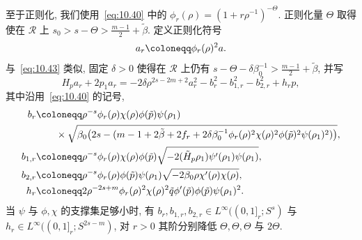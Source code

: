 至于正则化, 我们使用~\eqref{eq:10.40} 中的 $\phi_r(\rho) = (1 + r\rho^{-1})^{-\Theta}$. 正则化量 $\Theta$ 取得使在 $\mathcal{R}$ 上 $s_0 > s - \Theta > \frac{m-1}{2} + \tilde{\beta}$. 定义正则化符号
\begin{equation}\label{eq:10.67}
    a_r \defeq \phi_r(\rho)^2 a.
\end{equation}
与~\eqref{eq:10.43} 类似, 固定 $\delta > 0$ 使得在 $\mathcal{R}$ 上仍有 $s - \Theta - \delta\beta_0^{-1} > \frac{m-1}{2} + \tilde{\beta}$, 并写
\begin{equation}\label{eq:10.68}
    H_p a_r + 2p_1 a_r = -2\delta\rho^{2s-2m+2}a_r^2 - b_r^2 - b_{1,r}^2 - b_{2,r}^2 + h_r p,
\end{equation}
其中沿用~\eqref{eq:10.40} 的记号,
\begin{equation}\label{eq:10.69}
    \begin{aligned}
        b_r &\defeq \rho^{-s}\phi_r(\rho)\chi(\rho)\phi(\tilde{p})\psi(\rho_1) \\
        &\qquad \times \sqrt{\beta_0\bigl(2s - (m - 1 + 2\tilde{\beta} + 2f_r + 2\delta\beta_0^{-1}\phi_r(\rho)^2\chi(\rho)^2\phi(\tilde{p})^2\psi(\rho_1)^2)\bigr)}, \\
        b_{1,r} &\defeq \rho^{-s}\phi_r(\rho)\chi(\rho)\phi(\tilde{p})\sqrt{-2(\tilde{H}_p\rho_1)\psi'(\rho_1)\psi(\rho_1)}, \\
        b_{2,r} &\defeq \rho^{-s}\phi_r(\rho)\phi(\tilde{p})\psi(\rho_1)\sqrt{-2\beta_0\rho\chi'(\rho)\chi(\rho)}, \\
        h_r &\defeq 2\rho^{-2s+m}\phi_r(\rho)^2\chi(\rho)^2\tilde{q}\phi'(\tilde{p})\phi(\tilde{p})\psi(\rho_1)^2.
    \end{aligned}
\end{equation}
当 $\psi$ 与 $\phi, \chi$ 的支撑集足够小时, 有 $b_r, b_{1,r}, b_{2,r} \in L^\infty((0,1]_r; S^s)$ 与 $h_r \in L^\infty((0,1]_r; S^{2s-m})$, 对 $r > 0$ 其阶分别降低 $\Theta, \Theta, \Theta$ 与 $2\Theta$.

